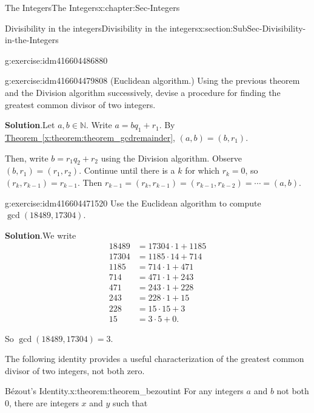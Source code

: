 \documentclass[oneside,10pt,]{book}
\numberwithin{equation}{section}
\def\N{{\mathbb N}}
\newcommand{\amp}{&}
\begin{document}
\begin{chapterptx}{The Integers}{}{The Integers}{}{}{x:chapter:Sec-Integers}
\begin{sectionptx}{Divisibility in the integers}{}{Divisibility in the integers}{}{}{x:section:SubSec-Divisibility-in-the-Integers}
\begin{inlineexercise}{}{g:exercise:idm416604486880}
\end{inlineexercise}
\begin{inlineexercise}{}{g:exercise:idm416604479808}%
\footnotemark{} (Euclidean algorithm.) Using the previous theorem and the Division algorithm successively, devise a procedure for finding the greatest common divisor of two integers.%
\par\smallskip%
\noindent\textbf{Solution}.\hypertarget{g:solution:idm416604477552}{}\quad{}Let \(a,b\in \N\). Write \(a = bq_1+r_1\). By \hyperref[x:theorem:theorem_gcdremainder]{Theorem~\ref{x:theorem:theorem_gcdremainder}}, \((a,b) = (b,r_1)\).%
\par
Then, write \(b = r_1 q_2 + r_2\) using the Division algorithm. Observe \((b,r_1) = (r_1,r_2)\). Continue until there is a \(k\) for which \(r_k = 0\), so \((r_k,r_{k-1}) = r_{k-1}\). Then \(r_{k-1}= (r_k, r_{k-1}) = (r_{k-1},r_{k-2}) = \cdots = (a,b)\).%
\end{inlineexercise}
%
\begin{inlineexercise}{}{g:exercise:idm416604471520}%
Use the Euclidean algorithm to compute \(\gcd(18489,17304)\).%
\par\smallskip%
\noindent\textbf{Solution}.\hypertarget{g:solution:idm416604469936}{}\quad{}We write%
\begin{align*}
18489 \amp = 17304 \cdot 1 +1185\\
17304 \amp = 1185\cdot 14 +714\\
1185 \amp = 714 \cdot 1 + 471\\
714 \amp = 471 \cdot 1+ 243\\
471 \amp = 243\cdot 1 + 228\\
243 \amp = 228 \cdot 1+ 15\\
228 \amp = 15 \cdot 15 + 3\\
15 \amp = 3\cdot 5 + 0\text{.}
\end{align*}
%
\par
So \(\gcd(18489,17304)=3\).%
\end{inlineexercise}
The following identity provides a useful characterization of the greatest common divisor of two integers, not both zero.%
\begin{theorem}{Bézout's Identity.}{}{x:theorem:theorem_bezoutint}%
For any integers \(a\) and \(b\) not both 0, there are integers \(x\) and \(y\) such that%
\begin{equation*}

\end{equation*}
\end{theorem}
\end{sectionptx}
\end{chapterptx}
\end{document}
